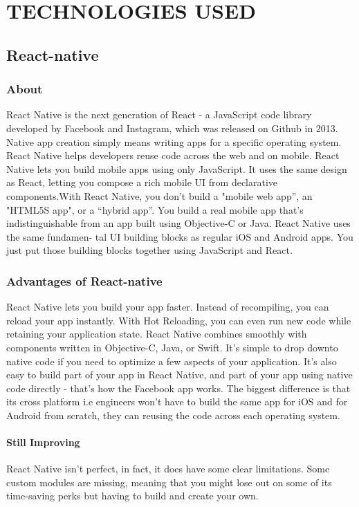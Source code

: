 \chapter{TECHNOLOGIES USED}
\section{React-native}
\subsection{About}
React Native is the next generation of React - a JavaScript code library developed by Facebook and Instagram, which was released on Github in 2013. Native app creation simply means writing apps for a specific operating system. React Native helps developers reuse code across the web and on mobile. React Native lets you build mobile apps using only JavaScript. It uses the same design as React, letting you compose a rich mobile UI from declarative components.With React Native, you don’t build a "mobile web app”, an "HTML5S app", or a “hybrid app”. You build a real mobile app that’s indistinguishable from an app built using Objective-C or Java. React Native uses the same fundamen- tal UI building blocks as regular iOS and Android apps. You just put those building blocks together using JavaScript and React.

\subsection{Advantages of React-native}
React Native lets you build your app faster. Instead of recompiling, you can reload your app instantly. With Hot Reloading, you can even run new code while retaining your application state.
React Native combines smoothly with components written in Objective-C, Java, or Swift. It’s simple to drop downto native code if you need to optimize a few aspects of your application. It’s also easy to build part of your app in React Native, and part of your app using native code directly - that’s how the Facebook app works.
The biggest difference is that its cross platform i.e engineers won’t have to build the same app for iOS and for Android from scratch, they can reusing the code across each operating system.

\subsubsection{Still Improving}
React Native isn’t perfect, in fact, it does have some clear limitations.
Some custom modules are missing, meaning that you might lose out on some of its time-saving perks but having to build and create your own.
\vspace{3cm}

